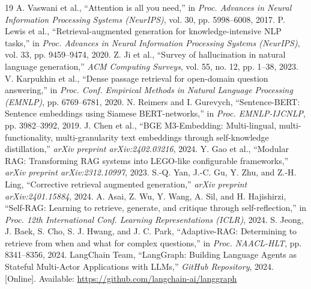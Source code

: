 \documentclass[conference]{IEEEtran}
\begin{document}
\begin{thebibliography}{19}
 A. Vaswani et al., ``Attention is all you need,'' in \textit{Proc. Advances in Neural Information Processing Systems (NeurIPS)}, vol. 30, pp. 5998--6008, 2017.
 P. Lewis et al., ``Retrieval-augmented generation for knowledge-intensive NLP tasks,'' in \textit{Proc. Advances in Neural Information Processing Systems (NeurIPS)}, vol. 33, pp. 9459--9474, 2020.
 Z. Ji et al., ``Survey of hallucination in natural language generation,'' \textit{ACM Computing Surveys}, vol. 55, no. 12, pp. 1--38, 2023.
 V. Karpukhin et al., ``Dense passage retrieval for open-domain question answering,'' in \textit{Proc. Conf. Empirical Methods in Natural Language Processing (EMNLP)}, pp. 6769--6781, 2020.
 N. Reimers and I. Gurevych, ``Sentence-BERT: Sentence embeddings using Siamese BERT-networks,'' in \textit{Proc. EMNLP-IJCNLP}, pp. 3982--3992, 2019.
 J. Chen et al., ``BGE M3-Embedding: Multi-lingual, multi-functionality, multi-granularity text embeddings through self-knowledge distillation,'' \textit{arXiv preprint arXiv:2402.03216}, 2024.
 Y. Gao et al., ``Modular RAG: Transforming RAG systems into LEGO-like configurable frameworks,'' \textit{arXiv preprint arXiv:2312.10997}, 2023.
 S.-Q. Yan, J.-C. Gu, Y. Zhu, and Z.-H. Ling, ``Corrective retrieval augmented generation,'' \textit{arXiv preprint arXiv:2401.15884}, 2024.
 A. Asai, Z. Wu, Y. Wang, A. Sil, and H. Hajishirzi, ``Self-RAG: Learning to retrieve, generate, and critique through self-reflection,'' in \textit{Proc. 12th International Conf. Learning Representations (ICLR)}, 2024.
 S. Jeong, J. Baek, S. Cho, S. J. Hwang, and J. C. Park, ``Adaptive-RAG: Determining to retrieve from when and what for complex questions,'' in \textit{Proc. NAACL-HLT}, pp. 8341--8356, 2024.
 LangChain Team, ``LangGraph: Building Language Agents as Stateful Multi-Actor Applications with LLMs,'' \textit{GitHub Repository}, 2024. [Online]. Available: \url{https://github.com/langchain-ai/langgraph}

\end{thebibliography}
\end{document}
